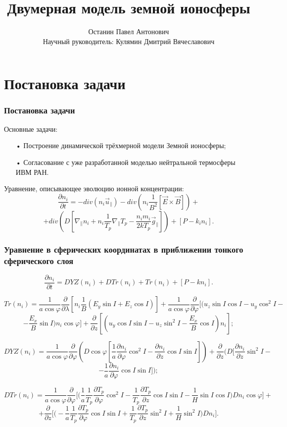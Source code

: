 \documentclass[9pt, apectratio=43,unicode]{beamer}
\title[Двумерная модель земной ионосферы]{Двумерная модель земной ионосферы}
\author[Останин П. А.]{Останин Павел Антонович \\ \vspace{1ex} Научный руководитель: Кулямин Дмитрий Вячеславович}
\date{}
\begin{document}
\begin{frame}[plain]
\titlepage
\end{frame}

\def\L{\mathcal{L}}

\section{Постановка задачи}
\begin{frame}\frametitle{Постановка задачи}
Основные задачи:
\begin{itemize}
\item[•] Построение динамической трёхмерной модели Земной ионосферы;
\item[•] Согласование с уже разработанной моделью нейтральной термосферы ИВМ РАН.
\end{itemize}

Уравнение, описывающее эволюцию ионной концентрации: $$\dfrac{\partial n_i}{\partial t} = -div(n_i \vec{u}_\parallel)-div\left(n_i\dfrac{1}{B^2}[\vec{E}\times \vec{B}] \right)+$$ $$+div\left(D\left[\nabla_\parallel n_i +n_i\dfrac{1}{T_p}\nabla_\parallel T_p - \dfrac{n_i m_i}{2kT_p}\vec{g}_\parallel\right]\right)+[P-k_in_i].$$

\end{frame}

\begin{frame}\frametitle{Уравнение в сферических координатах в приближении тонкого сферического слоя}

$$\dfrac{\partial n_i}{\partial t} = DYZ(n_i)+DTr(n_i)+Tr(n_i)+[P-kn_i].$$

$$Tr(n_i) = \dfrac{1}{a\cos\varphi}\dfrac{\partial}{\partial\lambda}\left[n_i\dfrac{1}{B}(E_y\sin I + E_z\cos I)\right]+\dfrac{1}{a\cos\varphi}\dfrac{\partial}{\partial\varphi}\bigg[\bigg(u_z\sin I \cos I - u_y\cos^2 I -$$ $$- \dfrac{E_x}{B}\sin I\bigg)n_i\cos\varphi\bigg]+\dfrac{\partial}{\partial z}\left[\left(u_y\cos I \sin I -u_z\sin^2 I - \dfrac{E_x}{B}\cos I\right)n_i\right];$$

$$DYZ(n_i) = \dfrac{1}{a\cos\varphi}\dfrac{\partial}{\partial\varphi}\left(D\cos\varphi\left[\dfrac{1}{a}\dfrac{\partial n_i}{\partial\varphi} \cos^2 I -\dfrac{\partial n_i}{\partial z}\cos I\sin I\right]\right)+ \dfrac{\partial}{\partial z}\bigg(D\bigg[\dfrac{\partial n_i}{\partial z}\sin^2 I -$$ $$- \dfrac{1}{a}\dfrac{\partial n_i}{\partial\varphi}\cos I \sin I\bigg]\bigg);$$ 

$$DTr(n_i) = \dfrac{1}{a\cos\varphi}\dfrac{\partial}{\partial \varphi}\bigg[\bigg(\dfrac{1}{a}\dfrac{1}{T_p}\dfrac{\partial T_p}{\partial\varphi}\cos^2 I-\dfrac{1}{T_p}\dfrac{\partial T_p}{\partial z}\cos I \sin I - \dfrac{1}{H}\sin I \cos I\bigg)Dn_i\cos\varphi\bigg] +$$ $$+ \dfrac{\partial}{\partial z}\bigg[\bigg(-\dfrac{1}{a}\dfrac{1}{T_p}\dfrac{\partial T_p}{\partial \varphi}\cos I \sin I +\dfrac{1}{T_p}\dfrac{\partial T_p}{\partial z}\sin^2 I+\dfrac{1}{H}\sin^2I\bigg)Dn_i\bigg].$$
\end{frame}
\end{document}
